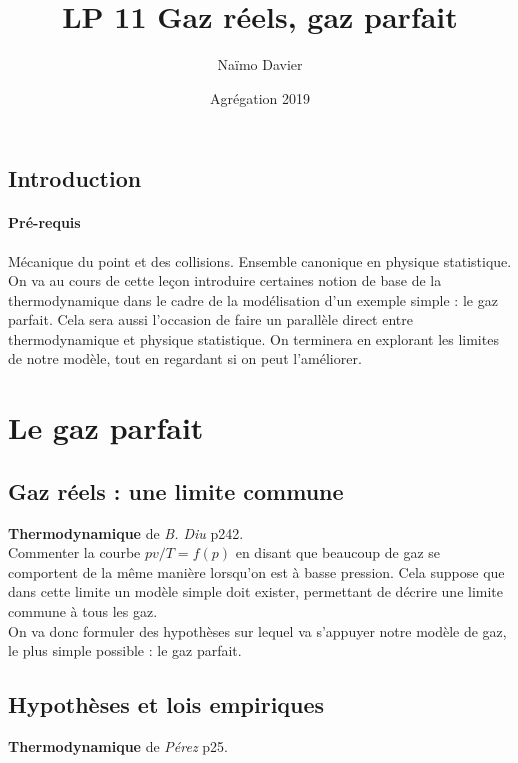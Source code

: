 \documentclass[12pt,prb,aps,epsf]{article}
\begin{document}
	
	\title{LP 11 Gaz réels, gaz parfait}
		\author{Naïmo Davier}
		\date{Agrégation 2019}
		
	\maketitle
	
	\tableofcontents
	
	\pagebreak
	
\subsection{Introduction}
\paragraph{Pré-requis} Mécanique du point et des collisions. Ensemble canonique en physique statistique.\\

On va au cours de cette leçon introduire certaines notion de base de la thermodynamique dans le cadre de la modélisation d'un exemple simple : le gaz parfait. Cela sera aussi l'occasion de faire un parallèle direct entre thermodynamique et physique statistique. On terminera en explorant les limites de notre modèle, tout en regardant si on peut l'améliorer.

\section{Le gaz parfait}
\subsection{Gaz réels : une limite commune}
\textbf{Thermodynamique} de \textit{B. Diu} p242.\\

Commenter la courbe $pv/T = f(p)$ en disant que beaucoup de gaz se comportent de la même manière lorsqu'on est à basse pression. Cela suppose que dans cette limite un modèle simple doit exister, permettant de décrire une limite commune à tous les gaz.\\

On va donc formuler des hypothèses sur lequel va s'appuyer notre modèle de gaz, le plus simple possible : le gaz parfait.

\subsection{Hypothèses et lois empiriques}
\textbf{Thermodynamique} de \textit{Pérez} p25.\\
\end{document}
